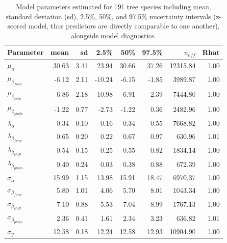 \documentclass[11pt]{article}
\begin{document}
\begin{table}[ht]
\centering
\caption{Model parameters estimated for 191 tree species including mean, standard deviation (sd), 2.5\%, 50\%, and 97.5\% uncertainty intervals (z-scored model, thus predictors are directly comparable to one another), alongside model diagnostics.} 
\label{tab:modelanglamb}
\begingroup\footnotesize
\begin{tabular}{lrrrrrrr}
  \hline
Parameter & mean & sd & 2.5\% & 50\% & 97.5\% & $n_{eff}$ & Rhat \\ 
  \hline
$\mu_{\alpha}$ & 30.63 & 3.41 & 23.94 & 30.66 & 37.26 & 12315.84 & 1.00 \\ 
  $\mu_{\beta_{force}}$ & -6.12 & 2.11 & -10.24 & -6.15 & -1.85 & 3989.87 & 1.00 \\ 
  $\mu_{\beta_{chill}}$ & -6.86 & 2.18 & -10.98 & -6.91 & -2.39 & 7444.80 & 1.00 \\ 
  $\mu_{\beta_{photo}}$ & -1.22 & 0.77 & -2.73 & -1.22 & 0.36 & 2482.96 & 1.00 \\ 
  $\lambda_{\alpha}$ & 0.34 & 0.10 & 0.16 & 0.34 & 0.55 & 7668.82 & 1.00 \\ 
  $\lambda_{\beta_{force}}$ & 0.65 & 0.20 & 0.22 & 0.67 & 0.97 & 630.96 & 1.01 \\ 
  $\lambda_{\beta_{chill}}$ & 0.54 & 0.15 & 0.25 & 0.55 & 0.82 & 1834.14 & 1.00 \\ 
  $\lambda_{\beta_{photo}}$ & 0.40 & 0.24 & 0.03 & 0.38 & 0.88 & 672.39 & 1.00 \\ 
  $\sigma_{\alpha}$ & 15.99 & 1.15 & 13.98 & 15.91 & 18.47 & 6970.37 & 1.00 \\ 
  $\sigma_{\beta_{force}}$ & 5.80 & 1.01 & 4.06 & 5.70 & 8.01 & 1043.34 & 1.00 \\ 
  $\sigma_{\beta_{chill}}$ & 7.10 & 0.88 & 5.53 & 7.04 & 8.99 & 1767.13 & 1.00 \\ 
  $\sigma_{\beta_{photo}}$ & 2.36 & 0.41 & 1.61 & 2.34 & 3.23 & 636.82 & 1.01 \\ 
  $\sigma_y$ & 12.58 & 0.18 & 12.24 & 12.58 & 12.93 & 10904.90 & 1.00 \\ 
   \hline
\end{tabular}
\endgroup
\end{table} \clearpage \pagebreak 
\end{document}

